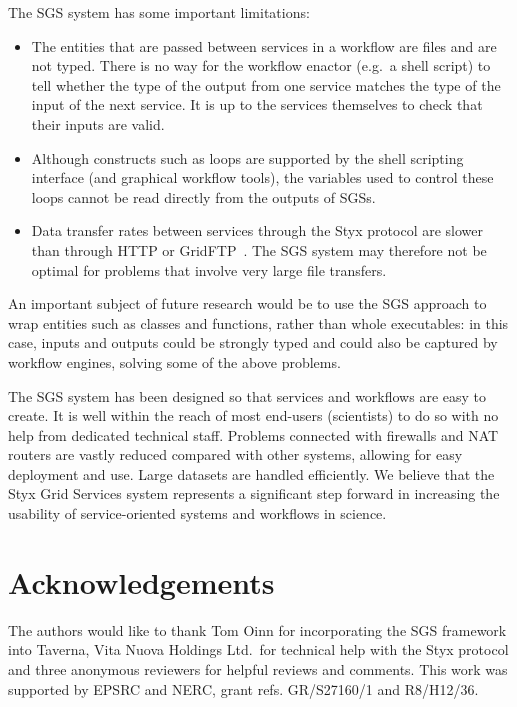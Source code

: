 \documentclass[a4paper]{article}
\begin{document}
The SGS system has some important limitations:

\begin{itemize}
	\item The entities that are passed between services in a workflow are files and are not typed.  There is no way for the workflow enactor (e.g.\ a shell script) to tell whether the type of the output from one service matches the type of the input of the next service.  It is up to the services themselves to check that their inputs are valid.
	\item Although constructs such as loops are supported by the shell scripting interface (and graphical workflow tools), the variables used to control these loops cannot be read directly from the outputs of SGSs.
	\item Data transfer rates between services through the Styx protocol are slower than through HTTP or GridFTP~\cite{blower:2005}.  The SGS system may therefore not be optimal for problems that involve very large file transfers.
\end{itemize}

An important subject of future research would be to use the SGS approach to wrap entities such as classes and functions, rather than whole executables: in this case, inputs and outputs could be strongly typed and could also be captured by workflow engines, solving some of the above problems.

The SGS system has been designed so that services and workflows are easy to create.  It is well within the reach of most end-users (scientists) to do so with no help from dedicated technical staff.  Problems connected with firewalls and NAT routers are vastly reduced compared with other systems, allowing for easy deployment and use.  Large datasets are handled efficiently.  We believe that the Styx Grid Services system represents a significant step forward in increasing the usability of service-oriented systems and workflows in science.
%

\section*{Acknowledgements}
The authors would like to thank Tom Oinn for incorporating the SGS framework into Taverna, Vita Nuova Holdings Ltd.\ for technical help with the Styx protocol and three anonymous reviewers for helpful reviews and comments.  This work was supported by EPSRC and NERC, grant refs. GR/S27160/1 and R8/H12/36.


\end{document}
